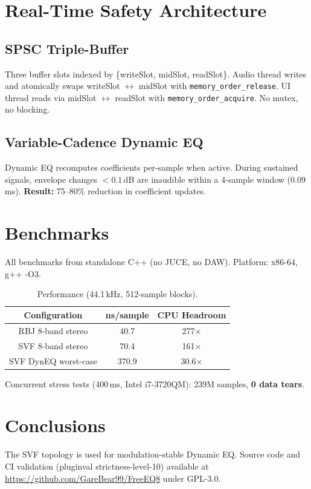 \documentclass[11pt,a4paper]{article}
\begin{document}
\section{Real-Time Safety Architecture}

\subsection{SPSC Triple-Buffer}
Three buffer slots indexed by \{writeSlot, midSlot, readSlot\}. Audio thread writes and atomically swaps writeSlot $\leftrightarrow$ midSlot with \texttt{memory\_order\_release}. UI thread reads via midSlot $\leftrightarrow$ readSlot with \texttt{memory\_order\_acquire}. No mutex, no blocking.

\subsection{Variable-Cadence Dynamic EQ}
Dynamic EQ recomputes coefficients per-sample when active. During sustained signals, envelope changes $< 0.1$\,dB are inaudible within a 4-sample window (0.09\,ms). \textbf{Result:} 75--80\% reduction in coefficient updates.

\section{Benchmarks}
All benchmarks from standalone C++ (no JUCE, no DAW). Platform: x86-64, g++ -O3.

\begin{table}[ht]
  \caption{Performance (44.1\,kHz, 512-sample blocks).}
  \centering
  \begin{tabular}{ccc}\toprule
    Configuration & ns/sample & CPU Headroom \\\midrule
    RBJ 8-band stereo & 40.7 & 277$\times$ \\
    SVF 8-band stereo & 70.4 & 161$\times$ \\
    SVF DynEQ worst-case & 370.9 & 30.6$\times$ \\\bottomrule
  \end{tabular}
\end{table}

Concurrent stress tests (400\,ms, Intel i7-3720QM): 239M samples, \textbf{0 data tears}.

\section{Conclusions}
The SVF topology is used for modulation-stable Dynamic EQ. Source code and CI validation (pluginval strictness-level-10) available at \url{https://github.com/GareBear99/FreeEQ8} under GPL-3.0.
\end{document}
